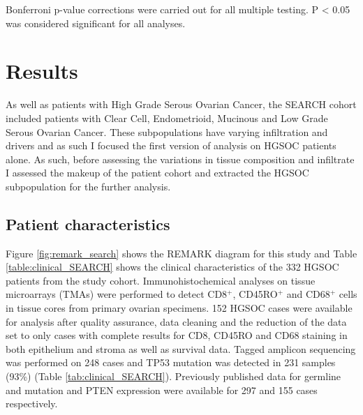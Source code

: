 Bonferroni p-value corrections were carried out for all multiple testing. P < 0.05 was considered significant for all analyses. 


\section{Results}
 
As well as patients with High Grade Serous Ovarian Cancer, the SEARCH cohort included patients with Clear Cell, Endometrioid, Mucinous and Low Grade Serous Ovarian Cancer. These subpopulations have varying infiltration and drivers and as such I focused the first version of analysis on HGSOC patients alone. As such, before assessing the variations in tissue composition and infiltrate I assessed the makeup of the patient cohort and extracted the HGSOC subpopulation for the further analysis.

\subsection{Patient characteristics}
Figure {\ref{fig:remark_search}} shows the REMARK diagram for this study and Table \ref{table:clinical_SEARCH} shows the clinical characteristics of the 332 HGSOC patients from the study cohort. Immunohistochemical analyses on tissue microarrays (TMAs) were performed to detect CD8$^+$, CD45RO$^+$ and CD68$^+$ cells in tissue cores from primary ovarian specimens.  152 HGSOC cases were available for analysis after quality assurance, data cleaning and the reduction of the data set to only cases with complete results for CD8, CD45RO and CD68 staining in both epithelium and stroma as well as survival data. 
Tagged amplicon sequencing was performed on 248 cases and TP53 mutation was detected in 231 samples (93\%) (Table \ref{tab:clinical_SEARCH}). Previously published data for germline   and  mutation and PTEN expression were available for 297 and 155 cases respectively\cite{17,20}.

